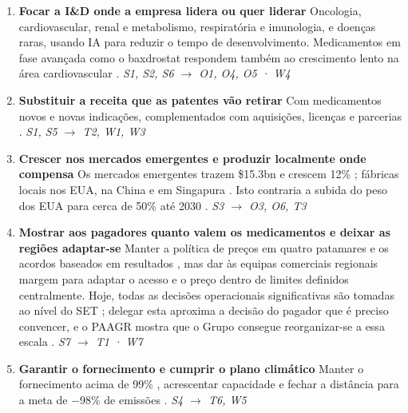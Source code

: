 \begin{enumerate}[topsep=4pt,itemsep=3pt]
  \item \textbf{Focar a I\&D onde a empresa lidera ou quer liderar} Oncologia, cardiovascular, renal e metabolismo, respiratória e imunologia, e doenças raras, usando IA para reduzir o tempo de desenvolvimento. Medicamentos em fase avançada como o baxdrostat respondem também ao crescimento lento na área cardiovascular \cite[p.~17]{AR}. \textit{\small S1, S2, S6 $\rightarrow$ O1, O4, O5 · W4}
  \item \textbf{Substituir a receita que as patentes vão retirar} Com medicamentos novos e novas indicações, complementados com aquisições, licenças e parcerias \cite[pp.~37, 48]{AR}. \textit{\small S1, S5 $\rightarrow$ T2, W1, W3}
  \item \textbf{Crescer nos mercados emergentes e produzir localmente onde compensa} Os mercados emergentes trazem \$15.3bn e crescem 12\% \cite[pp.~4, 33]{AR}; fábricas locais nos EUA, na China e em Singapura \cite[pp.~4, 5, 32, 37]{AR}. Isto contraria a subida do peso dos EUA para cerca de 50\% até 2030 \cite[p.~4]{AR}. \textit{\small S3 $\rightarrow$ O3, O6, T3}
  \item \textbf{Mostrar aos pagadores quanto valem os medicamentos e deixar as regiões adaptar-se} Manter a política de preços em quatro patamares e os acordos baseados em resultados \cite[pp.~41, 48]{AR}, mas dar às equipas comerciais regionais margem para adaptar o acesso e o preço dentro de limites definidos centralmente. Hoje, todas as decisões operacionais significativas são tomadas ao nível do SET \cite[p.~147]{AR}; delegar esta aproxima a decisão do pagador que é preciso convencer, e o PAAGR mostra que o Grupo consegue reorganizar-se a essa escala \cite[p.~59]{AR}. \textit{\small S7 $\rightarrow$ T1 · W7}
  \item \textbf{Garantir o fornecimento e cumprir o plano climático} Manter o fornecimento acima de 99\% \cite[p.~4]{AR}, acrescentar capacidade \cite[p.~33]{AR} e fechar a distância para a meta de $-$98\% de emissões \cite[p.~42]{AR}. \textit{\small S4 $\rightarrow$ T6, W5}
\end{enumerate}

